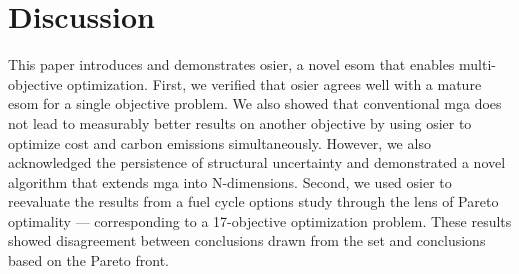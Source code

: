 \section{Discussion}


This paper introduces and demonstrates \gls{osier}, a novel \gls{esom} that
enables multi-objective optimization. First, we verified that \gls{osier} agrees
well with a mature \gls{esom} for a single objective problem. We also showed
that conventional \gls{mga} does not lead to measurably better results on
another objective by using \gls{osier} to optimize cost and carbon emissions
simultaneously. However, we also acknowledged the persistence of structural
uncertainty and demonstrated a novel algorithm that extends \gls{mga} into
N-dimensions. Second, we used \gls{osier} to reevaluate the results from a fuel
cycle options study through the lens of Pareto optimality --- corresponding to a
17-objective optimization problem. These results showed disagreement between
conclusions drawn from the \gls{set} and conclusions based on the Pareto front. 


